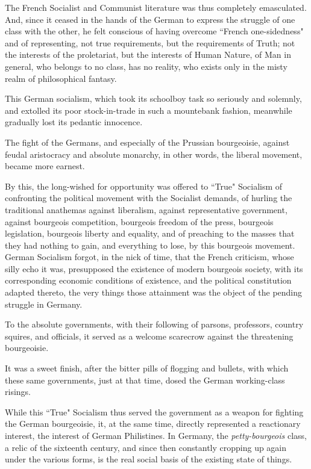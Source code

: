 The French Socialist and Communist literature was thus completely emasculated. And, since it ceased in the hands of the German to express the struggle of one class with the other, he felt conscious of having overcome ``French one-sidedness" and of representing, not true requirements, but the requirements of Truth; not the interests of the proletariat, but the interests of Human Nature, of Man in general, who belongs to no class, has no reality, who exists only in the misty realm of philosophical fantasy. 

This German socialism, which took its schoolboy task so seriously and solemnly, and extolled its poor stock-in-trade in such a mountebank fashion, meanwhile gradually lost its pedantic innocence. 

The fight of the Germans, and especially of the Prussian bourgeoisie, against feudal aristocracy and absolute monarchy, in other words, the liberal movement, became more earnest. 

By this, the long-wished for opportunity was offered to ``True" Socialism of confronting the political movement with the Socialist demands, of hurling the traditional anathemas against liberalism, against representative government, against bourgeois competition, bourgeois freedom of the press, bourgeois legislation, bourgeois liberty and equality, and of preaching to the masses that they had nothing to gain, and everything to lose, by this bourgeois movement. German Socialism forgot, in the nick of time, that the French criticism, whose silly echo it was, presupposed the existence of modern bourgeois society, with its corresponding economic conditions of existence, and the political constitution adapted thereto, the very things those attainment was the object of the pending struggle in Germany. 

To the absolute governments, with their following of parsons, professors, country squires, and officials, it served as a welcome scarecrow against the threatening bourgeoisie. 

It was a sweet finish, after the bitter pills of flogging and bullets, with which these same governments, just at that time, dosed the German working-class risings. 

While this ``True" Socialism thus served the government as a weapon for fighting the German bourgeoisie, it, at the same time, directly represented a reactionary interest, the interest of German Philistines. In Germany, the \emph{petty-bourgeois} class, a relic of the sixteenth century, and since then constantly cropping up again under the various forms, is the real social basis of the existing state of things. 

